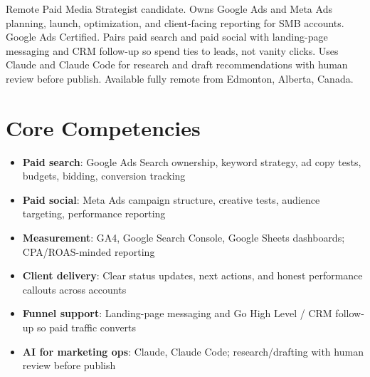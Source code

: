 \documentclass[11pt,a4paper,sans]{moderncv}
\begin{document}
\makecvtitle

\vspace{6pt}
\small{Remote Paid Media Strategist candidate. Owns Google Ads and Meta Ads planning, launch, optimization, and client-facing reporting for SMB accounts. Google Ads Certified. Pairs paid search and paid social with landing-page messaging and CRM follow-up so spend ties to leads, not vanity clicks. Uses Claude and Claude Code for research and draft recommendations with human review before publish. Available fully remote from Edmonton, Alberta, Canada.}

\section{Core Competencies}
\vspace{1pt}
\begin{itemize}
\item \textbf{Paid search}: Google Ads Search ownership, keyword strategy, ad copy tests, budgets, bidding, conversion tracking
\item \textbf{Paid social}: Meta Ads campaign structure, creative tests, audience targeting, performance reporting
\item \textbf{Measurement}: GA4, Google Search Console, Google Sheets dashboards; CPA/ROAS-minded reporting
\item \textbf{Client delivery}: Clear status updates, next actions, and honest performance callouts across accounts
\item \textbf{Funnel support}: Landing-page messaging and Go High Level / CRM follow-up so paid traffic converts
\item \textbf{AI for marketing ops}: Claude, Claude Code; research/drafting with human review before publish
\end{itemize}
\end{document}
